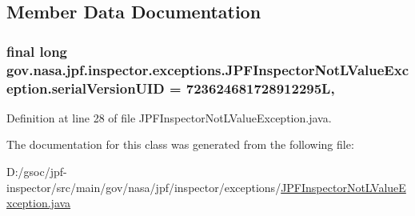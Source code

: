 \subsection{Member Data Documentation}
\subsubsection[{\texorpdfstring{serial\+Version\+U\+ID}{serialVersionUID}}]{\setlength{\rightskip}{0pt plus 5cm}final long gov.\+nasa.\+jpf.\+inspector.\+exceptions.\+J\+P\+F\+Inspector\+Not\+L\+Value\+Exception.\+serial\+Version\+U\+ID = 723624681728912295L\hspace{0.3cm}{\ttfamily [static]}, {\ttfamily [private]}}\hypertarget{classgov_1_1nasa_1_1jpf_1_1inspector_1_1exceptions_1_1_j_p_f_inspector_not_l_value_exception_aa2ff8a799155158520bf76069d8bacf0}{}\label{classgov_1_1nasa_1_1jpf_1_1inspector_1_1exceptions_1_1_j_p_f_inspector_not_l_value_exception_aa2ff8a799155158520bf76069d8bacf0}


Definition at line 28 of file J\+P\+F\+Inspector\+Not\+L\+Value\+Exception.\+java.



The documentation for this class was generated from the following file\+:\begin{DoxyCompactItemize}
\item 
D\+:/gsoc/jpf-\/inspector/src/main/gov/nasa/jpf/inspector/exceptions/\hyperlink{_j_p_f_inspector_not_l_value_exception_8java}{J\+P\+F\+Inspector\+Not\+L\+Value\+Exception.\+java}\end{DoxyCompactItemize}
